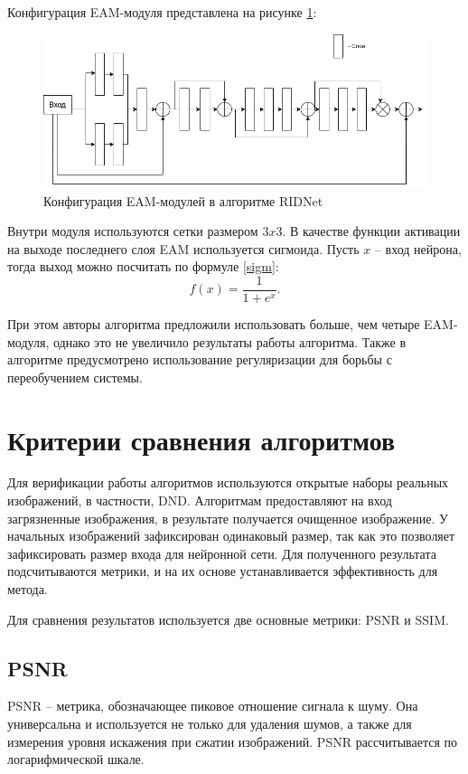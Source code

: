 Конфигурация EAM-модуля представлена на рисунке \ref{fig::ridnet2}:
\FloatBarrier
\begin{figure}[h]	
	\begin{center}
		\includegraphics[width=\linewidth]{inc/png/ridnet2.png}
	\end{center}
	\captionsetup{justification=centering}
	\caption{Конфигурация EAM-модулей в алгоритме RIDNet}
	\label{fig::ridnet2}
\end{figure}
\FloatBarrier

Внутри модуля используются сетки размером $3x3$. 
В качестве функции активации на выходе последнего слоя EAM используется сигмоида. 
Пусть $x$ -- вход нейрона, тогда выход можно посчитать по формуле \ref{sigm}:
\begin{equation}
	\label{sigm}
	f(x) = \frac{1}{1+e^x}.
\end{equation}

При этом авторы алгоритма предложили использовать больше, чем четыре EAM-модуля, однако это не увеличило результаты работы алгоритма.
Также в алгоритме предусмотрено использование регуляризации для борьбы с переобучением системы.

\section{Критерии сравнения алгоритмов}
Для верификации работы алгоритмов используются открытые наборы реальных изображений, в частности, DND. 
Алгоритмам предоставляют на вход загрязненные изображения, в результате получается очищенное изображение.
У начальных изображений зафиксирован одинаковый размер, так как это позволяет зафиксировать размер входа для нейронной сети.
Для полученного результата подсчитываются метрики, и на их основе устанавливается эффективность для метода.

Для сравнения результатов используется две основные метрики: PSNR и SSIM.

\subsection{PSNR}
PSNR -- метрика, обозначающее пиковое отношение сигнала к шуму.
Она универсальна и используется не только для удаления шумов, а также для измерения уровня искажения при сжатии изображений.
PSNR рассчитывается по логарифмической шкале.

